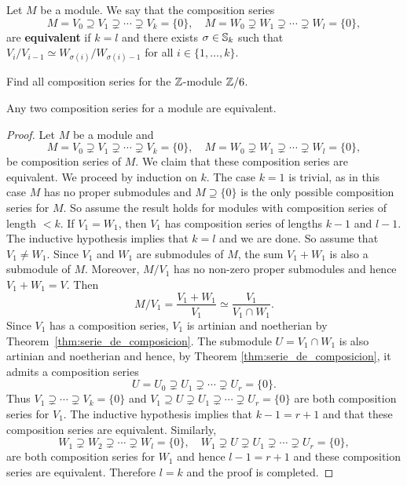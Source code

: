 \begin{definition}
    Let $M$ be a module. 
	We say that the composition series
	\[
	M=V_0\supseteq V_1\supsetneq\cdots\supsetneq V_k=\{0\},
	\quad
	M=W_0\supsetneq W_1\supsetneq\cdots\supsetneq W_l=\{0\},
	\]
	are \textbf{equivalent} if $k=l$ and there exists 
	$\sigma\in\mathbb{S}_k$ such that 
	$V_{i}/V_{i-1}\simeq W_{\sigma(i)}/W_{\sigma(i)-1}$
	for all $i\in\{1,\dots,k\}$.
\end{definition}

\begin{exercise}
\label{xca:Z6}
    Find all composition series
    for the $\mathbb{Z}$-module $\mathbb{Z}/6$. 
\end{exercise}

\begin{theorem}
	\label{thm:JordanHolder}
	Any two composition series for a module are equivalent. 
\end{theorem}

\begin{proof}
    Let $M$ be a module and
    \[
		M=V_0\supsetneq V_1\supsetneq\cdots\supsetneq V_k=\{0\},
		\quad
		M=W_0\supsetneq W_1\supsetneq\cdots\supsetneq W_l=\{0\},
	\]
	be composition series of $M$. 
	We claim that these composition series are equivalent. 
	We proceed by induction on $k$. The case $k=1$ is trivial, as 
	in this case $M$ has no proper submodules and $M\supseteq\{0\}$ 
	is the only possible composition series for $M$. So
	assume the result holds for modules with composition series of length $<k$. If $V_1=W_1$, then 
	$V_1$ has composition series of lengths $k-1$ and $l-1$. The inductive hypothesis implies that 
	$k=l$ and we are done. So assume that $V_1\ne W_1$. Since $V_1$ and $W_1$ are submodules of $M$, the
	sum $V_1+W_1$ is also a submodule of $M$. Moreover, $M/V_1$ has no non-zero proper submodules
	and hence 
	$V_1+W_1=V$. Then 
	\[
		M/V_1=\frac{V_1+W_1}{V_1}\simeq\frac{V_1}{V_1\cap W_1}.
	\]
	Since $V_1$ has a composition series, $V_1$ is artinian and
	noetherian by Theorem~\ref{thm:serie_de_composicion}. The submodule $U=V_1\cap W_1$ is also 
	artinian and noetherian and hence, by Theorem \ref{thm:serie_de_composicion}, 
	it admits a composition series 
	\[
		U=U_0\supsetneq U_1\supsetneq\cdots\supsetneq U_r=\{0\}.
	\]
    Thus
    $V_1\supsetneq\cdots\supsetneq V_k=\{0\}$ and  
	$V_1\supseteq U\supsetneq U_1\supsetneq\cdots\supsetneq U_r=\{0\}$ are both composition 
	series for $V_1$. The inductive hypothesis implies that 
	$k-1=r+1$ and that these composition series are equivalent. Similarly, 
	\[
		W_1\supsetneq W_2\supsetneq\cdots\supsetneq W_l=\{0\},
		\quad
		W_1\supsetneq U\supsetneq U_1\supsetneq\cdots\supsetneq U_{r}=\{0\},
	\]
    are both composition series for $W_1$ and hence $l-1=r+1$ and these composition 
    series are equivalent. Therefore $l=k$ and the proof is completed. 
\end{proof}

